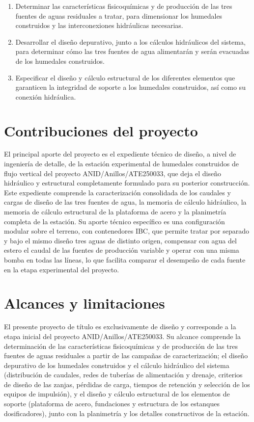 \begin{enumerate}
  \item Determinar las características fisicoquímicas y de producción de las tres fuentes de aguas residuales a tratar, para dimensionar los humedales construidos y las interconexiones hidráulicas necesarias.
  \item Desarrollar el diseño depurativo, junto a los cálculos hidráulicos del sistema, para determinar cómo las tres fuentes de agua alimentarán y serán evacuadas de los humedales construidos.
  \item Especificar el diseño y cálculo estructural de los diferentes elementos que garanticen la integridad de soporte a los humedales construidos, así como su conexión hidráulica.
\end{enumerate}

\section{Contribuciones del proyecto}
\label{sec:contribuciones}

El principal aporte del proyecto es el expediente técnico de diseño, a nivel de ingeniería de detalle, de la estación experimental de humedales construidos de flujo vertical del proyecto ANID/Anillos/ATE250033, que deja el diseño hidráulico y estructural completamente formulado para su posterior construcción.
Este expediente comprende la caracterización consolidada de los caudales y cargas de diseño de las tres fuentes de agua, la memoria de cálculo hidráulico, la memoria de cálculo estructural de la plataforma de acero y la planimetría completa de la estación.
Su aporte técnico específico es una configuración modular sobre el terreno, con contenedores IBC, que permite tratar por separado y bajo el mismo diseño tres aguas de distinto origen, compensar con agua del estero el caudal de las fuentes de producción variable y operar con una misma bomba en todas las líneas, lo que facilita comparar el desempeño de cada fuente en la etapa experimental del proyecto.

\section{Alcances y limitaciones}
\label{sec:alcances}

El presente proyecto de título es exclusivamente de diseño y corresponde a la etapa inicial del proyecto ANID/Anillos/ATE250033.
Su alcance comprende la determinación de las características fisicoquímicas y de producción de las tres fuentes de aguas residuales a partir de las campañas de caracterización; el diseño depurativo de los humedales construidos y el cálculo hidráulico del sistema (distribución de caudales, redes de tuberías de alimentación y drenaje, criterios de diseño de las zanjas, pérdidas de carga, tiempos de retención y selección de los equipos de impulsión), y el diseño y cálculo estructural de los elementos de soporte (plataforma de acero, fundaciones y estructura de los estanques dosificadores), junto con la planimetría y los detalles constructivos de la estación.
